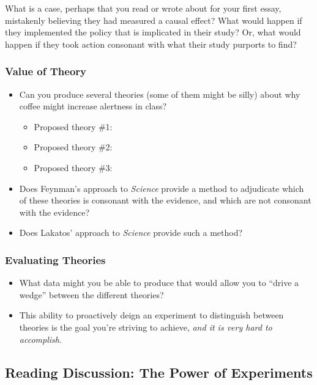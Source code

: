 \documentclass[
]{article}
\providecommand{\tightlist}{%
  \setlength{\itemsep}{0pt}\setlength{\parskip}{0pt}}
\theoremstyle{definition}
\theoremstyle{definition}
\theoremstyle{definition}
\theoremstyle{definition}
\theoremstyle{remark}
\begin{document}
What is a case, perhaps that you read or wrote about for your first essay, mistakenly believing they had measured a causal effect? What would happen if they implemented the policy that is implicated in their study? Or, what would happen if they took action consonant with what their study purports to find?

\subsubsection{Value of Theory}\label{value-of-theory}

\begin{itemize}
\tightlist
\item
  Can you produce several theories (some of them might be silly) about why coffee might increase alertness in class?

  \begin{itemize}
  \tightlist
  \item
    Proposed theory \#1:
  \item
    Proposed theory \#2:
  \item
    Proposed theory \#3:
  \end{itemize}
\item
  Does Feynman's approach to \emph{Science} provide a method to adjudicate which of these theories is consonant with the evidence, and which are not consonant with the evidence?
\item
  Does Lakatos' approach to \emph{Science} provide such a method?
\end{itemize}

\subsubsection{Evaluating Theories}\label{evaluating-theories}

\begin{itemize}
\tightlist
\item
  What data might you be able to produce that would allow you to ``drive a wedge'' between the different theories?
\item
  This ability to proactively deign an experiment to distinguish between theories is the goal you're striving to achieve, \emph{and it is very hard to accomplish}.
\end{itemize}

\subsection{Reading Discussion: The Power of Experiments}\label{reading-discussion-the-power-of-experiments}
\end{document}
